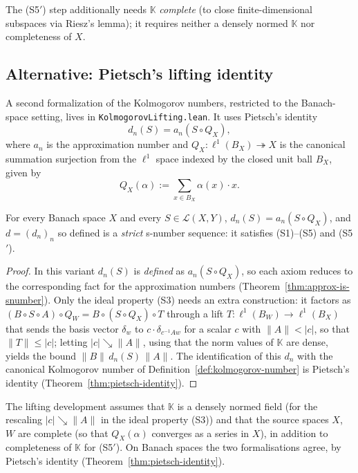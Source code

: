 The (S5$'$) step additionally needs $\mathbb{K}$ \emph{complete} (to close
finite-dimensional subspaces via Riesz's lemma); it requires neither a
densely normed $\mathbb{K}$ nor completeness of $X$.

\subsection{Alternative: Pietsch's lifting identity}
\label{subsec:kol-lifting}

A second formalization of the Kolmogorov numbers, restricted to the
Banach-space setting, lives in \texttt{KolmogorovLifting.lean}. It uses
Pietsch's identity
\[
  d_n(S) = a_n(S \circ Q_X),
\]
where $a_n$ is the approximation number and
$Q_X : \ell^1(B_X) \twoheadrightarrow X$ is the canonical summation
surjection from the $\ell^1$ space indexed by the closed unit ball
$B_X$, given by
\[
  Q_X(\alpha) := \sum_{x \in B_X} \alpha(x) \cdot x.
\]

\begin{theorem}
\label{thm:kolmogorov-lifting}
\leanok
{}
For every Banach space $X$ and every $S \in \mathcal{L}(X, Y)$,
$d_n(S) = a_n(S \circ Q_X)$, and $d = (d_n)_n$ so defined is a \emph{strict}
s-number sequence: it satisfies (S1)--(S5) and (S5$'$).
\end{theorem}
\begin{proof}
\leanok
{}
In this variant $d_n(S)$ is \emph{defined} as $a_n(S \circ Q_X)$, so each
axiom reduces to the corresponding fact for the approximation numbers
(Theorem~\ref{thm:approx-is-snumber}). Only the ideal property (S3) needs
an extra construction: it factors as
$(B \circ S \circ A) \circ Q_W = B \circ (S \circ Q_X) \circ T$
through a lift $T : \ell^1(B_W) \to \ell^1(B_X)$ that sends the basis
vector $\delta_w$ to $c \cdot \delta_{c^{-1} A w}$ for a scalar $c$ with
$\|A\| < |c|$, so that $\|T\| \le |c|$; letting $|c| \searrow \|A\|$,
using that the norm values of $\mathbb{K}$ are dense, yields the bound
$\|B\| \, d_n(S) \, \|A\|$. The identification of this $d_n$ with the
canonical Kolmogorov number of Definition~\ref{def:kolmogorov-number} is
Pietsch's identity (Theorem~\ref{thm:pietsch-identity}).
\end{proof}

The lifting development assumes that $\mathbb{K}$ is a densely normed field
(for the rescaling $|c| \searrow \|A\|$ in the ideal property (S3)) and that
the source spaces $X$, $W$ are complete
(so that $Q_X(\alpha)$ converges as a series in $X$), in addition to
completeness of $\mathbb{K}$ for (S5$'$). On Banach spaces the two
formalisations agree, by Pietsch's identity
(Theorem~\ref{thm:pietsch-identity}).

